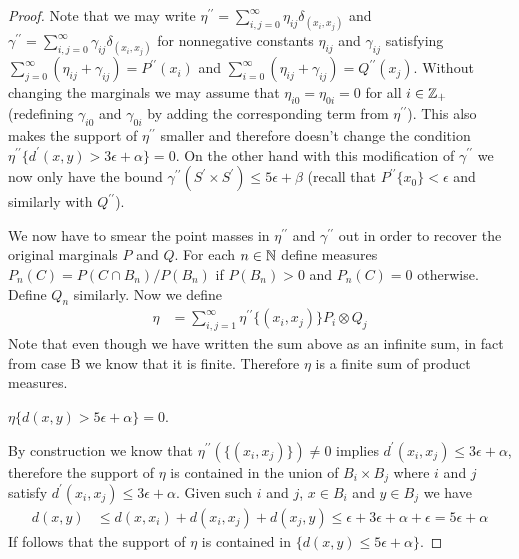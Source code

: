 \begin{proof}
Note that we may write $\eta^{\prime \prime} = \sum_{i,j=0}^\infty \eta_{ij} \delta_{(x_i,x_j)}$ and $\gamma^{\prime \prime}= \sum_{i,j=0}^\infty \gamma_{ij} \delta_{(x_i,x_j)}$ for nonnegative constants $\eta_{ij}$ and $\gamma_{ij}$ satisfying $\sum_{j=0}^\infty (\eta_{ij} + \gamma_{ij}) = P^{\prime \prime}(x_i)$ and $\sum_{i=0}^\infty (\eta_{ij} + \gamma_{ij}) = Q^{\prime \prime}(x_j)$.  Without changing the marginals we may assume that $\eta_{i0} = \eta_{0i} = 0$ for all $i \in \mathbb{Z}_+$ (redefining $\gamma_{i0}$ and $\gamma_{0i}$ by adding the corresponding term from $\eta^{\prime \prime}$).  This also makes the support of $\eta^{\prime \prime}$ smaller and therefore doesn't change the condition $\eta^{\prime \prime} \lbrace d^\prime(x,y) > 3\epsilon + \alpha \rbrace = 0$.  On the other hand with this modification of $\gamma^{\prime \prime}$ we now only have the bound $\gamma^{\prime \prime}(S^\prime \times S^{\prime}) \leq 5\epsilon + \beta$ (recall that $P^{\prime \prime} \lbrace x_0 \rbrace < \epsilon$ and similarly with $Q^{\prime \prime}$).

We now have to smear the point masses in $\eta^{\prime \prime}$ and $\gamma^{\prime \prime}$ out in order to recover the original marginals $P$ and $Q$.  For each $n \in \mathbb{N}$ define measures $P_n(C) = P(C \cap B_n) / P(B_n)$ if $P(B_n) > 0$ and $P_n(C) = 0$ otherwise.  Define $Q_n$ similarly.  Now we define
\begin{align*}
\eta &= \sum_{i,j = 1}^\infty \eta^{\prime \prime}\lbrace (x_i, x_j) \rbrace P_i \otimes Q_j
\end{align*}
Note that even though we have written the sum above as an infinite sum, in fact from case B we know that it is finite.  Therefore $\eta$ is a finite sum of product measures.

\begin{clm}$\eta \lbrace d(x,y) > 5\epsilon + \alpha \rbrace = 0$.
\end{clm}
By construction we know that $\eta^{\prime \prime}(\lbrace (x_i,x_j) \rbrace) \neq 0$ implies $d^\prime(x_i,x_j) \leq 3\epsilon + \alpha$, therefore the support of $\eta$ is contained in the union of $B_i \times B_j$ where $i$ and $j$ satisfy $d^\prime(x_i,x_j) \leq 3\epsilon + \alpha$.  Given such $i$ and $j$, $x \in B_i$ and $y \in B_j$
we have
\begin{align*}
d(x,y) &\leq d(x,x_i) + d(x_i,x_j) + d(x_j,y) \leq \epsilon + 3\epsilon + \alpha + \epsilon = 5\epsilon + \alpha
\end{align*}
If follows that the support of $\eta$ is contained in $\lbrace d(x,y) \leq 5\epsilon + \alpha \rbrace$.


\end{proof}

